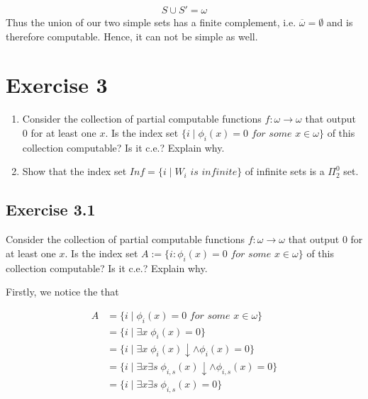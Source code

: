 \documentclass[11pt,a4paper]{article}
\begin{document}
\begin{equation*}
\begin{split}
S \cup S' = \omega
\end{split}
\end{equation*}
Thus the union of our two simple sets has a finite complement, i.e. $\overline{\omega}=\emptyset$ and is therefore computable. 
Hence, it can not be simple as well. 

\section*{Exercise 3}
\begin{enumerate}
\item Consider the collection of partial computable functions $f : \omega \rightarrow \omega$ that output $0$ for at least one $x$. Is the index set $\{i \mid \phi_i(x) = 0 \textit{ for some }x \in \omega\}$ of this collection computable? Is it c.e.? Explain why.
\item Show that the index set $Inf = \{i \mid W_i \textit{ is infinite}\}$ of infinite sets is a $\Pi_2^0$ set.

\end{enumerate}


\subsection*{Exercise 3.1}

Consider the collection of partial computable functions $f : \omega \to \omega$ that output $0$ for at least one $x$.
Is the index set $A:=\{i : \phi_i(x) = 0 \textit{ for some } x \in \omega\}$ of this collection computable? Is it c.e.? Explain why.

Firstly, we notice the that 

\begin{equation*}
\begin{split}
A & = \{i \mid \phi_i(x) = 0 \textit{ for some } x \in \omega\} \\
  & =  \{i \mid \exists x \; \phi_i(x) = 0\} \\
   & =  \{i \mid \exists x \; \phi_i(x)\downarrow \wedge \phi_i(x) = 0\} \\
& =  \{i \mid \exists x \exists s \; \phi_{i,s}(x)\downarrow \wedge \phi_{i,s}(x) = 0\} \\
  & = \{i \mid \exists x \exists s \; \phi_{i,s}(x) = 0\} \\
\end{split}
\end{equation*}
\end{document}
